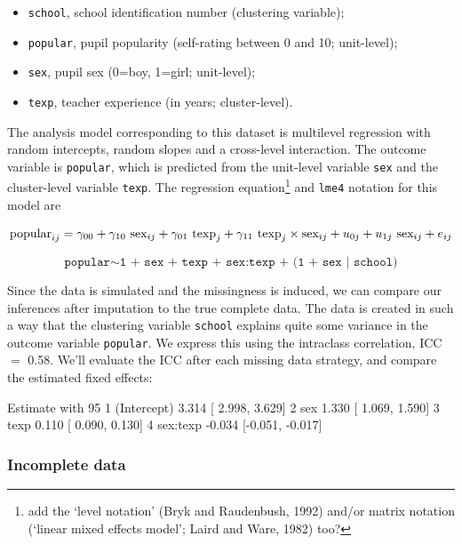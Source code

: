 \documentclass[
]{jss}
\providecommand{\tightlist}{%
  \setlength{\itemsep}{0pt}\setlength{\parskip}{0pt}}
\begin{document}
\begin{itemize}
\tightlist
\item
  \texttt{school}, school identification number (clustering variable);
\item
  \texttt{popular}, pupil popularity (self-rating between 0 and 10;
  unit-level);
\item
  \texttt{sex}, pupil sex (0=boy, 1=girl; unit-level);
\item
  \texttt{texp}, teacher experience (in years; cluster-level).
\end{itemize}

The analysis model corresponding to this dataset is multilevel
regression with random intercepts, random slopes and a cross-level
interaction. The outcome variable is \texttt{popular}, which is
predicted from the unit-level variable \texttt{sex} and the
cluster-level variable \texttt{texp}. The regression equation\footnote{add
  the `level notation' (Bryk and Raudenbush, 1992) and/or matrix
  notation (`linear mixed effects model'; Laird and Ware, 1982) too?}
and \texttt{lme4} notation for this model are

\[
\text{popular}_{ij} =
\gamma_{00} + 
\gamma_{10} \text{ sex}_{ij} + 
\gamma_{01} \text{ texp}_{j} + 
\gamma_{11} \text{ texp}_{j} \times \text{sex}_{ij} + 
u_{0j} + 
u_{1j} \text{ sex}_{ij} + 
e_{ij} \\
\]

\[
\texttt{popular} \sim  \texttt{1 + sex + texp + sex:texp + (1 + sex | school)}
\]

Since the data is simulated and the missingness is induced, we can
compare our inferences after imputation to the true complete data. The
data is created in such a way that the clustering variable
\texttt{school} explains quite some variance in the outcome variable
\texttt{popular}. We express this using the intraclass correlation, ICC
\(=\) 0.58. We'll evaluate the ICC after each missing data strategy, and
compare the estimated fixed effects:

\begin{CodeChunk}
\begin{CodeOutput}
                 Estimate with 95%
1 (Intercept)  3.314 [ 2.998,  3.629]
2         sex  1.330 [ 1.069,  1.590]
3        texp  0.110 [ 0.090,  0.130]
4    sex:texp -0.034 [-0.051, -0.017]
\end{CodeOutput}
\end{CodeChunk}

\hypertarget{incomplete-data}{%
\subsubsection{Incomplete data}\label{incomplete-data}}
\end{document}
